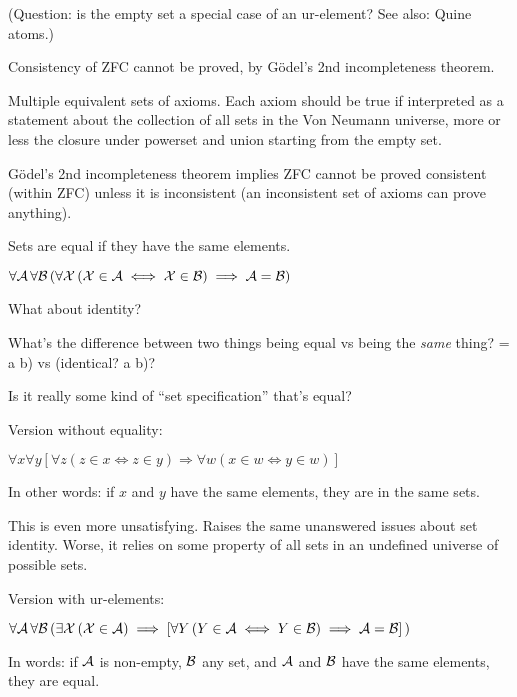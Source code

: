 (Question: is the empty set a special case of an ur-element?
See also: Quine atoms\cite{wiki:Urelement}.)

Consistency of \textsf{ZFC} cannot be proved, 
by G\"{o}del's 2nd incompleteness theorem.

Multiple equivalent sets of axioms.
Each axiom should be true if interpreted as a statement about the
collection of all sets in the Von Neumann 
universe\cite{wiki:Von_Neumann_universe},
more or less the closure under powerset and union starting
from the empty set.

G\"{o}del's 2nd incompleteness theorem implies \textsf{ZFC}
cannot be proved consistent (within \textsf{ZFC}) 
unless it is inconsistent 
(an inconsistent set of axioms can prove anything).


Sets are equal if they have the same 
elements.\cite{wiki:Axiom_of_extensionality,wiki:Extensionality}

$\forall \mathcal{A}\,\forall \mathcal{B}\,
(\forall \mathcal{X}\,(\mathcal{X}\in \mathcal{A}\iff \mathcal{X}\in \mathcal{B})
\implies \mathcal{A}=\mathcal{B})$

What about identity? 

What's the difference between two things being equal vs
being the \textit{same} thing? 
\textsf{= a b)} vs \textsf{(identical? a b)}?

Is it really some kind of ``set specification'' that's equal?

Version without equality:

$\forall x
\forall y
[\forall z(z\in x\Leftrightarrow z\in y)
\Rightarrow 
\forall w(x\in w\Leftrightarrow y\in w)]$

In other words: if $x$ and $y$ have the same elements, 
they are in the same sets.

This is even more unsatisfying. 
Raises the same unanswered issues about set identity.
Worse, it relies on some property of all sets in an undefined 
universe of possible sets.

Version with ur-elements:

$\forall \mathcal{A}\,
\forall \mathcal{B}\,
(\exists \mathcal{X}\,(\mathcal{X}\in \mathcal{A})
\implies
 [\forall Y\,
 (Y\in \mathcal{A}
 \iff 
 Y\in \mathcal{B}) \implies \mathcal{A}=\mathcal{B}]\,)$
 
In words: 
if $\mathcal{\mathcal{A}}$ is non-empty, $\mathcal{B}$ any set, 
and $\mathcal{\mathcal{A}}$ and $\mathcal{B}$ have the same
elements, they are equal.

